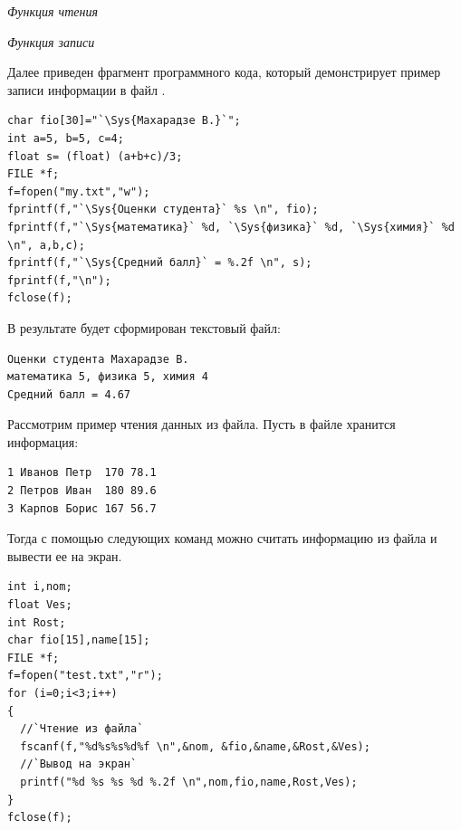 \emph{Функция чтения}


\emph{Функция записи}


Далее приведен фрагмент программного кода, который демонстрирует пример записи информации в файл
.
\begin{lstlisting}
char fio[30]="`\Sys{Махарадзе В.}`";
int a=5, b=5, c=4;
float s= (float) (a+b+c)/3;
FILE *f;
f=fopen("my.txt","w");
fprintf(f,"`\Sys{Оценки студента}` %s \n", fio);
fprintf(f,"`\Sys{математика}` %d, `\Sys{физика}` %d, `\Sys{химия}` %d \n", a,b,c);
fprintf(f,"`\Sys{Средний балл}` = %.2f \n", s);
fprintf(f,"\n");
fclose(f);
\end{lstlisting}

В результате будет сформирован текстовый файл:
\begin{verbatim}
Оценки студента Махарадзе В.
математика 5, физика 5, химия 4
Средний балл = 4.67
\end{verbatim}

Рассмотрим пример чтения данных из файла. Пусть в файле  хранится информация:
\begin{verbatim}
1 Иванов Петр  170 78.1
2 Петров Иван  180 89.6
3 Карпов Борис 167 56.7
\end{verbatim}

Тогда с помощью следующих команд можно считать информацию из файла и вывести ее на экран.
\begin{lstlisting}
int i,nom;
float Ves;
int Rost;
char fio[15],name[15];
FILE *f;	
f=fopen("test.txt","r");
for (i=0;i<3;i++)
{
  //`Чтение из файла`
  fscanf(f,"%d%s%s%d%f \n",&nom, &fio,&name,&Rost,&Ves);
  //`Вывод на экран`
  printf("%d %s %s %d %.2f \n",nom,fio,name,Rost,Ves);
}
fclose(f);
\end{lstlisting}
